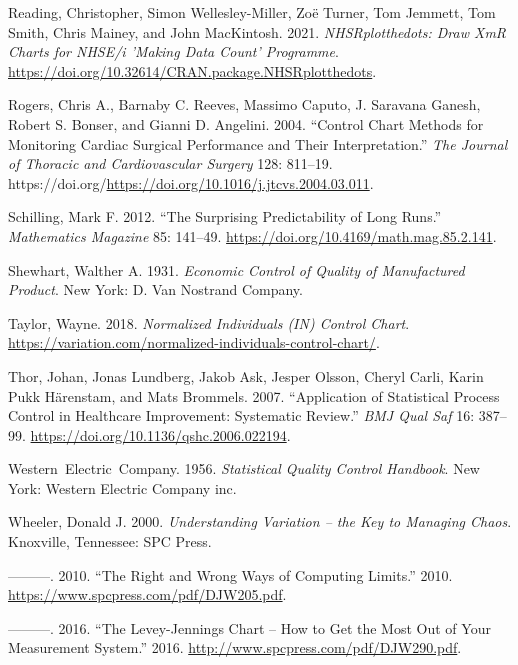 \documentclass[
]{book}
\newlength{\cslhangindent}
\newenvironment{CSLReferences}[2] %
 {\begin{list}{}{%
  \setlength{\itemindent}{0pt}
  \setlength{\leftmargin}{0pt}
  \setlength{\parsep}{0pt}
  \ifodd #1
   \setlength{\leftmargin}{\cslhangindent}
   \setlength{\itemindent}{-1\cslhangindent}
  \fi
  \setlength{\itemsep}{#2\baselineskip}}}
 {\end{list}}
\begin{document}
\begin{CSLReferences}{1}{0}
Reading, Christopher, Simon Wellesley-Miller, Zoë Turner, Tom Jemmett, Tom Smith, Chris Mainey, and John MacKintosh. 2021. \emph{NHSRplotthedots: Draw XmR Charts for NHSE/i 'Making Data Count' Programme}. \url{https://doi.org/10.32614/CRAN.package.NHSRplotthedots}.

Rogers, Chris A., Barnaby C. Reeves, Massimo Caputo, J. Saravana Ganesh, Robert S. Bonser, and Gianni D. Angelini. 2004. {``Control Chart Methods for Monitoring Cardiac Surgical Performance and Their Interpretation.''} \emph{The Journal of Thoracic and Cardiovascular Surgery} 128: 811--19. https://doi.org/\url{https://doi.org/10.1016/j.jtcvs.2004.03.011}.

Schilling, Mark F. 2012. {``The Surprising Predictability of Long Runs.''} \emph{Mathematics Magazine} 85: 141--49. \url{https://doi.org/10.4169/math.mag.85.2.141}.

Shewhart, Walther A. 1931. \emph{Economic Control of Quality of Manufactured Product}. New York: D. Van Nostrand Company.

Taylor, Wayne. 2018. \emph{Normalized Individuals (IN) Control Chart}. \url{https://variation.com/normalized-individuals-control-chart/}.

Thor, Johan, Jonas Lundberg, Jakob Ask, Jesper Olsson, Cheryl Carli, Karin Pukk Härenstam, and Mats Brommels. 2007. {``Application of Statistical Process Control in Healthcare Improvement: Systematic Review.''} \emph{BMJ Qual Saf} 16: 387--99. \url{https://doi.org/10.1136/qshc.2006.022194}.

Western~Electric~Company. 1956. \emph{Statistical Quality Control Handbook}. New York: Western Electric Company inc.

Wheeler, Donald J. 2000. \emph{Understanding Variation -- the Key to Managing Chaos}. Knoxville, Tennessee: SPC Press.

---------. 2010. {``The Right and Wrong Ways of Computing Limits.''} 2010. \url{https://www.spcpress.com/pdf/DJW205.pdf}.

---------. 2016. {``The Levey-Jennings Chart -- How to Get the Most Out of Your Measurement System.''} 2016. \url{http://www.spcpress.com/pdf/DJW290.pdf}.

\end{CSLReferences}
\end{document}
